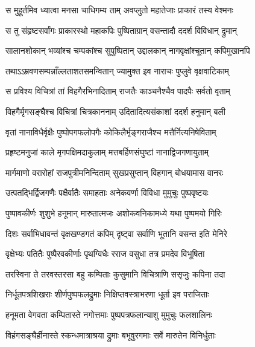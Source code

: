 
\twolineshloka
{स मुहूर्तमिव ध्यात्वा मनसा चाधिगम्य ताम्}
{अवप्लुतो महातेजाः प्राकारं तस्य वेश्मनः} %

\twolineshloka
{स तु संहृष्टसर्वांगः प्राकारस्थो महाकपिः}
{पुष्पिताग्रान् वसन्तादौ ददर्श विविधान् द्रुमान्} %

\twolineshloka
{सालानशोकान् भव्यांश्च चम्पकांश्च सुपुष्पितान्}
{उद्दालकान् नागवृक्षांश्चूतान् कपिमुखानपि} %

\twolineshloka
{तथाऽऽम्रवणसम्पन्नाँल्लताशतसमन्वितान्}
{ज्यामुक्त इव नाराचः पुप्लुवे वृक्षवाटिकाम्} %

\twolineshloka
{स प्रविश्य विचित्रां तां विहगैरभिनादिताम्}
{राजतैः काञ्चनैश्चैव पादपैः सर्वतो वृताम्} %

\twolineshloka
{विहगैर्मृगसङ्घैश्च विचित्रां चित्रकाननाम्}
{उदितादित्यसंकाशां ददर्श हनुमान् बली} %

\twolineshloka
{वृतां नानाविधैर्वृक्षैः पुष्पोपगफलोपगैः}
{कोकिलैर्भृङ्गराजैश्च मत्तैर्नित्यनिषेविताम्} %

\twolineshloka
{प्रहृष्टमनुजां काले मृगपक्षिमदाकुलाम्}
{मत्तबर्हिणसंघुष्टां नानाद्विजगणायुताम्} %

\twolineshloka
{मार्गमाणो वरारोहां राजपुत्रीमनिन्दिताम्}
{सुखप्रसुप्तान् विहगान् बोधयामास वानरः} %

\twolineshloka
{उत्पतद्भिर्द्विजगणैः पक्षैर्वातैः समाहताः}
{अनेकवर्णा विविधा मुमुचुः पुष्पवृष्टयः} %

\twolineshloka
{पुष्पावकीर्णः शुशुभे हनूमान् मारुतात्मजः}
{अशोकवनिकामध्ये यथा पुष्पमयो गिरिः} %

\twolineshloka
{दिशः सर्वाभिधावन्तं वृक्षखण्डगतं कपिम्}
{दृष्ट्वा सर्वाणि भूतानि वसन्त इति मेनिरे} %

\twolineshloka
{वृक्षेभ्यः पतितैः पुष्पैरवकीर्णाः पृथग्विधैः}
{रराज वसुधा तत्र प्रमदेव विभूषिता} %

\twolineshloka
{तरस्विना ते तरवस्तरसा बहु कम्पिताः}
{कुसुमानि विचित्राणि ससृजुः कपिना तदा} %

\twolineshloka
{निर्धूतपत्रशिखराः शीर्णपुष्पफलद्रुमाः}
{निक्षिप्तवस्त्राभरणा धूर्ता इव पराजिताः} %

\twolineshloka
{हनूमता वेगवता कम्पितास्ते नगोत्तमाः}
{पुष्पपत्रफलान्याशु मुमुचुः फलशालिनः} %

\twolineshloka
{विहंगसङ्घैर्हीनास्ते स्कन्धमात्राश्रया द्रुमाः}
{बभूवुरगमाः सर्वे मारुतेन विनिर्धुताः} %

